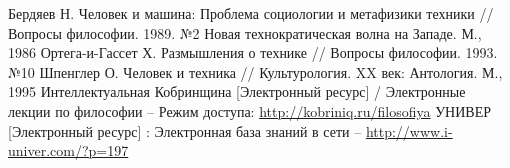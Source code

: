 \renewcommand{\refname}{Список используемой литературы}
\begin{thebibliography}{9}
     Бердяев Н. Человек и машина: Проблема социологии и 
        метафизики техники // Вопросы философии. 1989. №2 
     Новая технократическая волна на Западе. М., 1986
     Ортега-и-Гассет Х. Размышления о технике // 
        Вопросы философии. 1993. №10
     Шпенглер О. Человек и техника // Культурология. XX век:
        Антология. М., 1995
     Интеллектуальная Кобринщина [Электронный ресурс] / 
        Электронные лекции по философии -- Режим доступа: 
        \url{http://kobriniq.ru/filosofiya}
     УНИВЕР [Электронный ресурс] : Электронная база знаний в 
        сети -- \url{http://www.i-univer.com/?p=197}
\end{thebibliography}